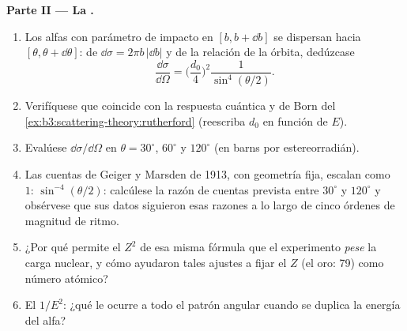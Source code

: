 \begin{problem}
\medskip\noindent\textbf{Parte II --- La .}
\begin{enumerate}[resume]
  \item Los alfas con parámetro de impacto en $[b, b + \dd b]$ se
        dispersan hacia $[\theta, \theta + \dd\theta]$: de $\dd\sigma =
        2\pi b\,|\dd b|$ y de la relación de la órbita, dedúzcase
        \[
        \frac{\dd\sigma}{\dd\Omega} =
        \Big(\frac{d_0}{4}\Big)^2\frac{1}{\sin^4(\theta/2)} .
        \]
  \item Verifíquese que coincide con la respuesta cuántica y de Born del
        \cref{ex:b3:scattering-theory:rutherford} (reescriba $d_0$
        en función de $E$).
  \item Evalúese $\dd\sigma/\dd\Omega$ en $\theta = 30^\circ$,
        $60^\circ$ y $120^\circ$ (en barns por estereorradián).
  \item Las cuentas de Geiger y Marsden de 1913, con geometría fija,
        escalan como $1{:}\,\sin^{-4}(\theta/2)$: calcúlese la razón de
        cuentas prevista entre $30^\circ$ y $120^\circ$ y
        obsérvese que sus datos siguieron esas razones a lo largo de cinco
        órdenes de magnitud de ritmo.
  \item ¿Por qué permite el $Z^2$ de esa misma fórmula que el experimento
        \emph{pese} la carga nuclear, y cómo ayudaron tales ajustes a
        fijar el $Z$ (el oro: 79) como número atómico?
  \item El $1/E^2$: ¿qué le ocurre a todo el patrón angular cuando se
        duplica la energía del alfa?
\end{enumerate}


\end{problem}
